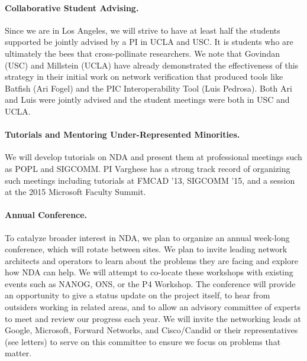 \paragraph*{Collaborative Student Advising.}
%
Since we are in Los Angeles, we will strive to have at least half the students
supported be jointly advised by a PI in UCLA and USC.  It is students who 
are ultimately the bees that cross-pollinate researchers.  We note that Govindan
(USC) and Millstein (UCLA) have already demonstrated the effectiveness of this
strategy in their initial work on network verification that produced tools like
Batfish  (Ari Fogel) and the PIC Interoperability Tool (Luis Pedrosa).  Both Ari
and Luis were jointly advised and the student meetings were both in USC
and UCLA.



\paragraph*{Tutorials and Mentoring Under-Represented Minorities.}
%
We will develop tutorials on NDA and present them at professional meetings such as POPL and SIGCOMM. PI Varghese has a strong track record of organizing such meetings including tutorials at FMCAD '13, SIGCOMM '15, and a session at the 2015 Microsoft Faculty Summit. 

\paragraph*{Annual Conference.}
%
To catalyze broader interest in NDA, we plan to organize an annual week-long conference, which will rotate between sites.  We plan to invite leading network architects and operators to learn about the problems they are facing and explore how NDA can help. We will attempt to co-locate these workshops with existing events such as NANOG, ONS, or the P4 Workshop. The conference will provide an opportunity to give a status update on the project itself, to hear from outsiders working in related areas, and to allow an advisory  committee of experts to meet and review our progress each year.  We will invite the networking leads at Google, Microsoft, Forward Networks, and  Cisco/Candid or their representatives (see letters) to serve on this committee to ensure we focus on problems that matter.

